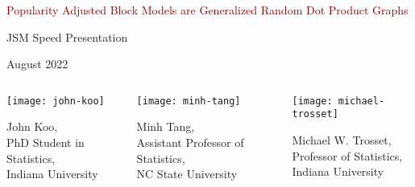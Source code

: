 \documentclass[
  ignorenonframetext,
]{beamer}
\author[John Koo]{John Koo}
\author{}
\date{\vspace{-2.5em}}
\begin{document}
\begin{frame}[plain]{}
\protect\hypertarget{section}{}
\center

\LARGE

\textcolor{darkred}{Popularity Adjusted Block Models are Generalized Random Dot Product Graphs}

\normalsize

JSM Speed Presentation

August 2022

\begin{columns}[T]
\begin{column}{0.33\textwidth}
\begin{center}\texttt{[image: john-koo]} \end{center}

John Koo,\\
PhD Student in Statistics,\\
Indiana University
\end{column}

\begin{column}{0.33\textwidth}
\begin{center}\texttt{[image: minh-tang]} \end{center}

Minh Tang,\\
Assistant Professor of Statistics,\\
NC State University
\end{column}

\begin{column}{0.33\textwidth}
\begin{center}\texttt{[image: michael-trosset]} \end{center}

Michael W. Trosset,\\
Professor of Statistics,\\
Indiana University
\end{column}
\end{columns}
\end{frame}
\end{document}
